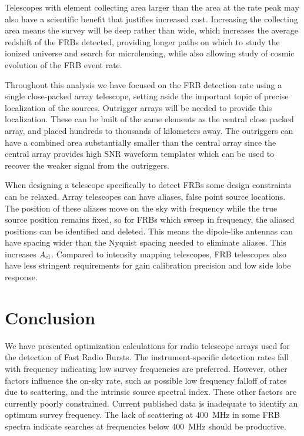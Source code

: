 \documentclass[fleqn,usenatbib]{mnras}
\begin{document}
Telescopes with element collecting area larger than the area at the rate peak may also have a scientific benefit that justifies increased cost. Increasing the collecting area means the survey will be deep rather than wide, which increases the average redshift of the FRBs detected, providing longer paths on which to study the ionized universe and search for microlensing, while also allowing study of cosmic evolution of the FRB event rate.

Throughout this analysis we have focused on the FRB detection rate using a single close-packed array telescope, setting aside the important topic of precise localization of the sources. Outrigger arrays will be needed to provide this localization. These can be built of the same elements as the central close packed array, and placed hundreds to thousands of kilometers away.   The outriggers can have a combined area substantially smaller than the central array since the central array provides high SNR waveform templates which can be used to recover the weaker signal from the outriggers.

When designing a telescope specifically to detect FRBs some design constraints can be relaxed.  Array telescopes can have aliases, false point source locations. The position of these aliases move on the sky with frequency while the true source position remains fixed, so for FRBs which sweep in frequency, the aliased positions can be identified and deleted. This means the dipole-like antennas can have spacing wider than the Nyquist spacing needed to eliminate aliases. This increases $A_{\rm{el}}$. Compared to intensity mapping telescopes, FRB telescopes also have less stringent requirements for gain calibration precision and low side lobe response.

\section{Conclusion}

We have presented optimization calculations for radio telescope arrays used for the detection of Fast Radio Bursts.  The instrument-specific detection rates fall with frequency indicating low survey frequencies are preferred. However, other factors influence the on-sky rate, such as possible low frequency falloff of rates due to scattering, and the intrinsic source spectral index. These other factors are currently poorly constrained. Current published data is inadequate to identify an optimum survey frequency. The lack of scattering at 400~MHz in some FRB spectra indicate searches at frequencies below 400~MHz should be productive.
\end{document}
